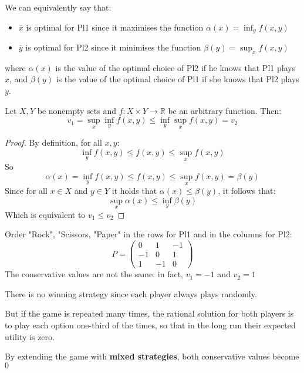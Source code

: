 \documentclass[../main.tex]{subfiles}
\begin{document}
We can equivalently say that:
\begin{itemize}
    \item $\overline{x}$ is optimal for Pl1 since it maximises the function $\alpha (x) = \inf_y f(x,y)$
    \item $\overline{y}$ is optimal for Pl2 since it minimises the function $\beta (y) = \sup_x f(x,y)$
\end{itemize}
where $\alpha(x)$ is the value of the optimal choice of Pl2 if he knows that Pl1 plays $x$, and $\beta(y)$ is the value of the optimal choice of Pl1 if she knows that Pl2 plays $y$.

\begin{proposition}[$v_1 \leq v_2$]
    Let $X, Y$ be nonempty sets and $f: X \times Y \to \mathbb{R}$ be an arbitrary function. Then:
    \[
        v_1 = \sup_x \inf_y f(x,y) \leq \inf_y \sup_x f(x,y) = v_2
    \]
\end{proposition}
\begin{proof}
    By definition, for all $x,y$:
    \[
        \inf_y f(x,y) \leq f(x,y) \leq \sup_x f(x,y)
    \]
    So
    \[
        \alpha (x) = \inf_y f(x,y) \leq f(x,y) \leq \sup_x f(x,y) = \beta (y)
    \]
    Since for all $x \in X$ and $y \in Y$ it holds that $\alpha (x) \leq \beta (y)$, it follows that:
    \[
        \sup_x \alpha (x) \leq \inf_y \beta (y)
    \]
    Which is equivalent to $v_1 \leq v_2$
\end{proof}

\begin{example}
    Order "Rock", "Scissors, "Paper" in the rows for Pl1 and in the columns for Pl2:
    \[
        P = \begin{pmatrix}
            0  & 1  & -1 \\
            -1 & 0  & 1  \\
            1  & -1 & 0
        \end{pmatrix}
    \]
    The conservative values are not the same: in fact, $v_1 =-1$ and $v_2 = 1$

    There is no winning strategy since each player always plays randomly.

    But if the game is repeated many times, the rational solution for both players is to play each option one-third of the times, so that in the long run their expected utility is zero.

    By extending the game with \textbf{mixed strategies}, both conservative values become $0$
\end{example}
\end{document}
